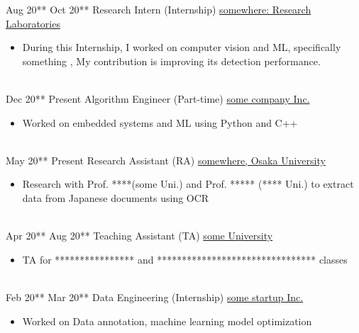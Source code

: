 \documentclass[letterpaper]{DS_class_file} %
\begin{document}
\begin{twenty}
        \twentyitem
		{Aug 20**}
		{Oct 20**}
		{\hspace{0.3cm}Research Intern (Internship)}
		{\href{https://www.es.osaka-u.ac.jp/en/index.html}{somewhere: Research Laboratories}}
		{}
		{\begin{itemize}
			\item During this Internship, I worked on computer vision and ML, specifically something \href{https://www.es.osaka-u.ac.jp/en/index.html}{\color{blue}{something}}, My contribution is improving its detection performance.
		\end{itemize}}
		\\
		\twentyitem
		{Dec 20**}
		{Present}
		{\hspace{0.3cm}Algorithm Engineer (Part-time)}
		{\href{https://www.es.osaka-u.ac.jp/en/index.html}{some company Inc.}}
		{}
		{\begin{itemize}
			\item Worked on embedded systems and ML using Python and C++
		\end{itemize}}
		\\
    \twentyitem
		{May 20**}
		{Present}
		{\hspace{0.3cm}Research Assistant (RA)}
		{\href{https://www.es.osaka-u.ac.jp/en/index.html}{somewhere, Osaka University}}
		{}
		{\begin{itemize}
			\item Research with Prof. ****(some Uni.) and Prof. ***** (**** Uni.) to extract data from Japanese documents using OCR
		\end{itemize}}
		\\
		\twentyitem
		{Apr 20**}
		{Aug 20**}
		{\hspace{0.3cm}Teaching Assistant (TA)}
		{\href{https://www.es.osaka-u.ac.jp/en/index.html}{ some University}}
		{}
		{\begin{itemize}
			\item TA for **************** and ******************************** classes
		\end{itemize}}
		\\
	\twentyitem
		{Feb 20**}
		{Mar 20**}
		{\hspace{0.3cm}Data Engineering (Internship)}
		{\href{https://www.es.osaka-u.ac.jp/en/index.html}{some startup Inc.}}
		{}
		{\begin{itemize}
			\item Worked on Data annotation, machine learning model optimization     
		\end{itemize}}
		\\
	           
\end{twenty}
\end{document}
